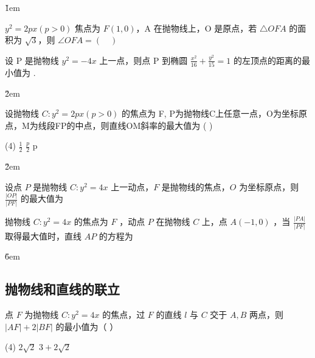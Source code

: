 \v{1em}

\begin{problem}
$y^2=2px(p>0)$ 焦点为 $F(1,0)$，A 在抛物线上，O 是原点，若 $\triangle OFA$ 的面积为 $\sqrt{3}$，则 $\angle OFA = ( \quad )$
\end{problem}

\vspace{2em}

\begin{problem}
设 P 是抛物线 $y^2=-4 x$ 上一点，则点 P 到椭圆 $\frac{x^2}{16}+\frac{y^2}{15}=1$ 的左顶点的距离的最小值为 \underline{\hspace{2em}}.
\end{problem}

\v{2em}

\begin{problem}
设抛物线 $C: y^2=2px(p>0)$ 的焦点为 F, P为抛物线C上任意一点，O为坐标原点，M为线段FP的中点，则直线OM斜率的最大值为 ( \quad )
\begin{tasks}(4)
    \task $\frac{1}{2}$
    \task $\frac{p}{2}$
    \task p
\end{tasks}
\end{problem}

\v{2em}

\begin{example}
    设点 $P$ 是抛物线 $C: y^2=4 x$ 上一动点，$F$ 是抛物线的焦点，$O$ 为坐标原点，则 $\frac{|O P|}{|P F|}$ 的最大值为 $\qquad$
\end{example}

\vspace{6em}

\begin{example}
    抛物线 $C: y^2=4 x$ 的焦点为 $F$ ，动点 $P$ 在抛物线 $C$ 上，点 $A(-1,0)$ ，当 $\frac{|P A|}{|P F|}$ 取得最大值时，直线 $A P$ 的方程为 $\qquad$
\end{example}

\v{6em}

\subsection{抛物线和直线的联立}

\begin{example}
    点 $F$ 为抛物线 $C: y^2=4 x$ 的焦点，过 $F$ 的直线 $l$ 与 $C$ 交于 $A, B$ 两点，则 $|A F|+2|B F|$ 的最小值为（ \hspace{2em}）
    \begin{tasks}(4)
        \task $2 \sqrt{2}$
        \task $3+2 \sqrt{2}$
    \end{tasks}
\end{example}

